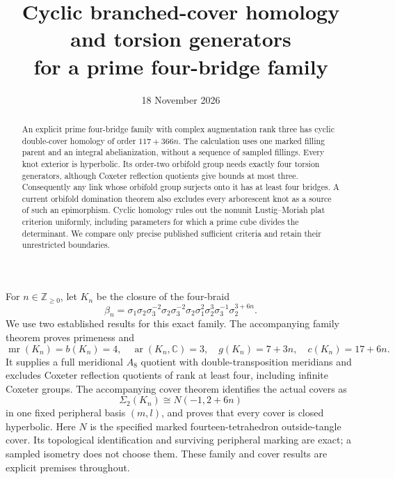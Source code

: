 \documentclass[11pt]{article}
\title{Cyclic branched-cover homology and torsion generators\protect\\
for a prime four-bridge family}
\author{}
\date{18 November 2026}
\newcommand{\mr}{\operatorname{mr}}
\newcommand{\ar}{\operatorname{ar}}
\newcommand{\Z}{\mathbb Z}
\newcommand{\Sig}{\Sigma_2}
\begin{document}
\maketitle
\begin{abstract}
An explicit prime four-bridge family with complex augmentation rank
three has cyclic double-cover homology of order $117+366n$.
The calculation uses one marked filling parent and an integral
abelianization, without a sequence of sampled fillings. Every knot
exterior is hyperbolic. Its order-two orbifold group needs exactly
four torsion generators, although Coxeter reflection quotients give
bounds at most three. Consequently any link whose orbifold group
surjects onto it has at least four bridges. A current orbifold
domination theorem also excludes every arborescent knot as a source
of such an epimorphism. Cyclic homology rules out the nonunit
Lustig--Moriah plat criterion uniformly, including parameters for
which a prime cube divides the determinant. We compare only precise
published sufficient criteria and retain their unrestricted boundaries.
\end{abstract}

For $n\in\Z_{\ge0}$, let $K_n$ be the closure of the four-braid
\begin{equation}\label{eq:braid}
\beta_n=\sigma_1\sigma_2\sigma_3^{-2}\sigma_2\sigma_3^{-2}
\sigma_2\sigma_1^2\sigma_2^3\sigma_3^{-1}\sigma_2^{3+6n}.
\end{equation}
We use two established results for this exact family.
The accompanying family theorem \cite[Theorem \texttt{thm:main},
Lemma \texttt{lem:alexander}]{family} proves primeness and
\[
 \mr(K_n)=b(K_n)=4,\quad \ar(K_n,\mathbb C)=3,
 \quad g(K_n)=7+3n,\quad c(K_n)=17+6n.
\]
It supplies a full meridional $A_8$ quotient with double-transposition
meridians and excludes Coxeter reflection quotients of rank at least
four, including infinite Coxeter groups.
The accompanying cover theorem \cite[Theorems \texttt{thm:binding}
and \texttt{thm:allcovers}]{covers} identifies the actual covers as
\begin{equation}\label{eq:fill}
                \Sig(K_n)\cong N(-1,2+6n)
\end{equation}
in one fixed peripheral basis $(m,l)$, and proves that every cover is
closed hyperbolic. Here $N$ is the specified marked fourteen-tetrahedron
outside-tangle cover. Its topological identification and surviving
peripheral marking are exact; a sampled isometry does not choose them.
These family and cover results are explicit premises throughout.
\end{document}
